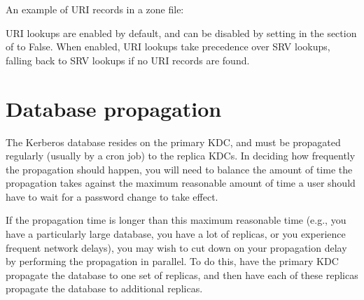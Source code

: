 \documentclass[letterpaper,10pt,english]{sphinxmanual}
\begin{document}
\sphinxAtStartPar
An example of URI records in a zone file:

\begin{sphinxVerbatim}[commandchars=\\\{\}]
      
                           
                           
                           
\end{sphinxVerbatim}

\sphinxAtStartPar
URI lookups are enabled by default, and can be disabled by setting
 in the {\hyperref[\detokenize{admin/conf_files/krb5_conf:libdefaults}]{}} section of
{\hyperref[\detokenize{admin/conf_files/krb5_conf:krb5-conf-5}]{}} to False.  When enabled, URI lookups take
precedence over SRV lookups, falling back to SRV lookups if no URI
records are found.


\section{Database propagation}
\label{\detokenize{admin/realm_config:database-propagation}}\label{\detokenize{admin/realm_config:db-prop}}
\sphinxAtStartPar
The Kerberos database resides on the primary KDC, and must be
propagated regularly (usually by a cron job) to the replica KDCs.  In
deciding how frequently the propagation should happen, you will need
to balance the amount of time the propagation takes against the
maximum reasonable amount of time a user should have to wait for a
password change to take effect.

\sphinxAtStartPar
If the propagation time is longer than this maximum reasonable time
(e.g., you have a particularly large database, you have a lot of
replicas, or you experience frequent network delays), you may wish to
cut down on your propagation delay by performing the propagation in
parallel.  To do this, have the primary KDC propagate the database to
one set of replicas, and then have each of these replicas propagate
the database to additional replicas.
\end{document}
